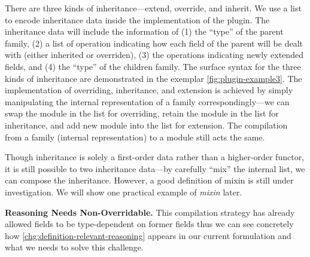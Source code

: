 There are three kinds of inheritance---extend, override, and inherit. We
use a list to encode inheritance data inside the
implementation of the plugin. The inheritance data will include the
information of (1) the ``type'' of the parent family, (2) a list of
operation indicating how each field of the parent will be dealt with
(either inherited or overriden), (3) the operations indicating newly
extended fields, and (4) the ``type'' of the children family.
The surface syntax for the three kinds of inheritance
are demonstrated in the exemplar \cref*{fig:plugin-example3}. The
implementation of overriding, inheritance, and extension is achieved by
simply manipulating the internal representation of a family
correspondingly---we can swap the module in the list for overriding,
retain the module in the list for inheritance, and add new module into
the list for extension. The compilation from a family (internal
representation) to a module still acts the same.

Though inheritance is solely a first-order data rather
than a higher-order functor, it is still possible to
 two inheritance data---by carefully ``mix'' the internal list, we can compose the inheritance. However, a good definition of mixin is still under investigation. We will show one practical example of \textit{mixin} later.





\textbf{Reasoning Needs Non-Overridable.}
This compilation strategy
has already allowed fields to be type-dependent on former fields thus we can see concretely how
\ref{chg:definition-relevant-reasoning} appears in our current formulation and what we needs to solve this challenge. 


